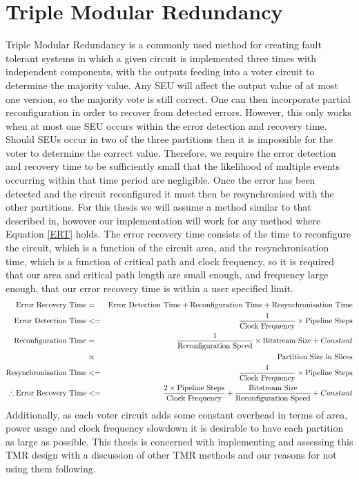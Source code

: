 \documentclass[12pt,drafta4paper,oneside]{memoir} %
\begin{document}
\section{Triple Modular Redundancy}
Triple Modular Redundancy is a commonly used method for creating fault tolerant systems in which a given circuit is implemented three times with independent components, with the outputs feeding into a voter circuit to determine the majority value. Any \ac{SEU} will affect the output value of at most one version, so the majority vote is still correct. One can then incorporate partial reconfiguration in order to recover from detected errors. However, this only works when at most one \ac{SEU} occurs within the error detection and recovery time. Should \acp{SEU} occur in two of the three partitions then it is impossible for the voter to determine the correct value. Therefore, we require the error detection and recovery time to be sufficiently small that the likelihood of multiple events occurring within that time period are negligible.
Once the error has been detected and the circuit reconfigured it must then be resynchronised with the other partitions. For this thesis we will assume a method similar to that described in\cite{DiesselChange}, however our implementation will work for any method where Equation \ref{ERT} holds.
The error recovery time consists of the time to reconfigure the circuit, which is a function of the circuit area, and the resynchronisation time, which is a function of critical path and clock frequency, so it is required that our area and critical path length are small enough, and frequency large enough, that our error recovery time is within a user specified limit.
\begin{align}
    \mbox{Error Recovery Time} &=&\mbox{Error Detection Time} + \mbox{Reconfiguration Time} + \mbox{Resynchronisation Time}\notag\\
    \mbox{Error Detection Time} &<=& \frac{1}{\mbox{Clock Frequency}}\times\mbox{Pipeline Steps}\notag\\
    \mbox{Reconfiguration Time} &=& \frac{1}{\mbox{Reconfiguration Speed}}\times\mbox{Bitstream Size}+Constant\notag\\
     &\propto& \mbox{Partition Size in Slices}\notag\\
    \mbox{Resynchronisation Time} &<=& \frac{1}{\mbox{Clock Frequency}}\times\mbox{Pipeline Steps}\\
    \therefore \mbox{Error Recovery Time} &<=& \frac{2\times\mbox{Pipeline Steps}}{\mbox{Clock Frequency}} + \frac{\mbox{Bitstream Size}}{\mbox{Reconfiguration Speed}}+Constant\label{ERT}
\end{align}\cite{DiesselChange}
Additionally, as each voter circuit adds some constant overhead in terms of area, power usage and clock frequency slowdown it is desirable to have each partition as large as possible. This thesis is concerned with implementing and assessing this \ac{TMR} design with a discussion of other \ac{TMR} methods and our reasons for not using them following.
\end{document}
